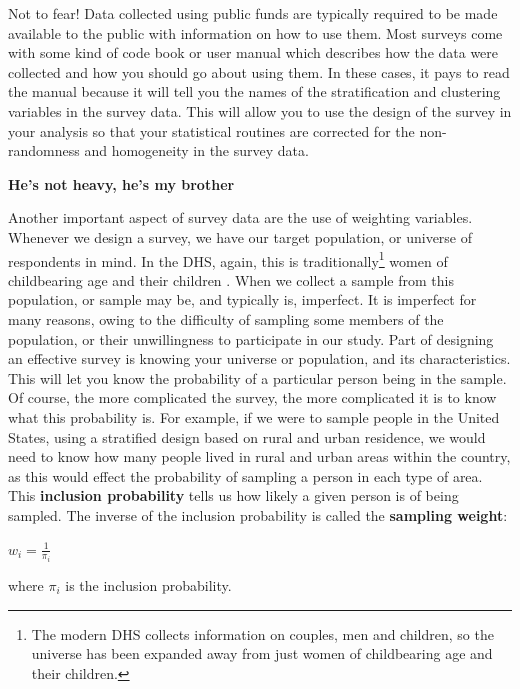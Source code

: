 \documentclass[
]{article}
\begin{document}
Not to fear! Data collected using public funds are typically required to be made available to the public with information on how to use them. Most surveys come with some kind of code book or user manual which describes how the data were collected and how you should go about using them. In these cases, it pays to read the manual because it will tell you the names of the stratification and clustering variables in the survey data. This will allow you to use the design of the survey in your analysis so that your statistical routines are corrected for the non-randomness and homogeneity in the survey data.

\textbf{He's not heavy, he's my brother}

Another important aspect of survey data are the use of weighting variables. Whenever we design a survey, we have our target population, or universe of respondents in mind. In the DHS, again, this is traditionally\footnote{The modern DHS collects information on couples, men and children, so the universe has been expanded away from just women of childbearing age and their children.} women of childbearing age and their children \citep{international_demographic_2012}. When we collect a sample from this population, or sample may be, and typically is, imperfect. It is imperfect for many reasons, owing to the difficulty of sampling some members of the population, or their unwillingness to participate in our study. Part of designing an effective survey is knowing your universe or population, and its characteristics. This will let you know the probability of a particular person being in the sample. Of course, the more complicated the survey, the more complicated it is to know what this probability is. For example, if we were to sample people in the United States, using a stratified design based on rural and urban residence, we would need to know how many people lived in rural and urban areas within the country, as this would effect the probability of sampling a person in each type of area. This \textbf{inclusion probability} tells us how likely a given person is of being sampled. The inverse of the inclusion probability is called the \textbf{sampling weight}:

\(w_i = \frac{1} {\pi_i}\)

where \(\pi_i\) is the inclusion probability.
\end{document}
